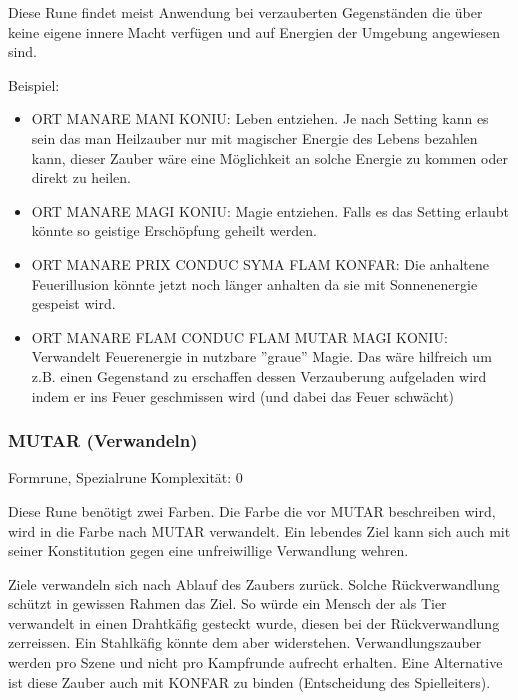 \documentclass{article}
\begin{document}
Diese Rune findet meist Anwendung bei verzauberten Gegenständen die über keine eigene innere Macht verfügen und auf
Energien der Umgebung angewiesen sind.

Beispiel:

\begin{itemize}
\item ORT MANARE MANI KONIU: Leben entziehen. Je nach Setting kann es sein das man Heilzauber nur mit magischer Energie des Lebens bezahlen kann, dieser Zauber wäre eine Möglichkeit an solche Energie zu kommen oder direkt zu heilen.
\end{itemize}

\begin{itemize}
\item ORT MANARE MAGI KONIU: Magie entziehen. Falls es das Setting erlaubt könnte so geistige Erschöpfung geheilt werden.
\end{itemize}

\begin{itemize}
\item ORT MANARE PRIX CONDUC SYMA FLAM KONFAR: Die anhaltene Feuerillusion könnte jetzt noch länger anhalten da sie mit Sonnenenergie gespeist wird.
\end{itemize}

\begin{itemize}
\item ORT MANARE FLAM CONDUC FLAM MUTAR MAGI KONIU: Verwandelt Feuerenergie in nutzbare ''graue'' Magie. Das wäre hilfreich um z.B. einen Gegenstand zu erschaffen dessen Verzauberung aufgeladen wird indem er ins Feuer geschmissen wird (und dabei das Feuer schwächt)
\end{itemize}

\subsubsection{MUTAR (Verwandeln)}

Formrune, Spezialrune Komplexität: 0

Diese Rune benötigt zwei Farben. Die Farbe die vor MUTAR beschreiben wird, wird in die Farbe nach MUTAR verwandelt.
Ein lebendes Ziel kann sich auch mit seiner Konstitution gegen eine unfreiwillige Verwandlung wehren.

Ziele verwandeln sich nach Ablauf des Zaubers zurück. Solche Rückverwandlung schützt in gewissen Rahmen das Ziel. So
würde ein Mensch der als Tier verwandelt in einen Drahtkäfig gesteckt wurde, diesen bei der Rückverwandlung
zerreissen. Ein Stahlkäfig könnte dem aber widerstehen. Verwandlungszauber werden pro Szene und nicht pro Kampfrunde
aufrecht erhalten. Eine Alternative ist diese Zauber auch mit KONFAR zu binden (Entscheidung des Spielleiters).
\end{document}
